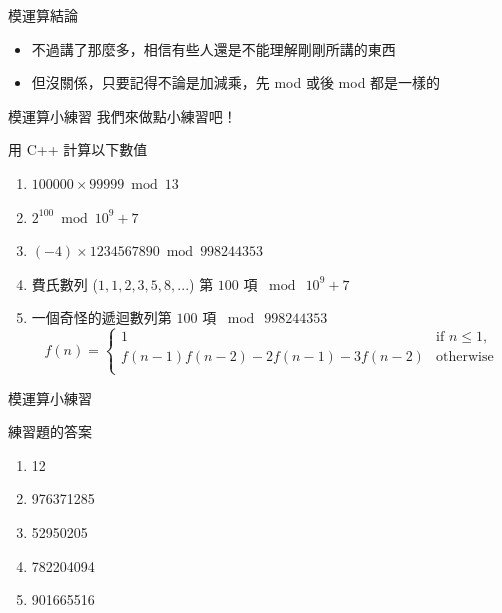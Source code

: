 \documentclass[aspectratio=169]{beamer}
\begin{document}
    \begin{frame}{模運算結論}
        \begin{itemize}
            \item 不過講了那麼多，相信有些人還是不能理解剛剛所講的東西
            \item 但沒關係，只要記得不論是加減乘，先 mod 或後 mod 都是一樣的
        \end{itemize}
    \end{frame}
    
    \begin{frame}{模運算小練習}
        我們來做點小練習吧！
        \begin{block}{用 C++ 計算以下數值}
            \begin{enumerate}
                \item $100000 \times 99999 \bmod 13$
                \item $2^{100} \bmod 10^9+7$
                \item $(-4) \times 1234567890 \bmod 998244353$
                \item 費氏數列 ($1,1,2,3,5,8,...$) 第 $100$ 項 $\bmod \ 10^9+7$
                \item 一個奇怪的遞迴數列第 $100$ 項 $\bmod \ 998244353$
                $$
                f(n) = \begin{cases}
                    1 & \text{if } n \le 1, \\
                    f(n-1)f(n-2) - 2f(n-1) - 3f(n-2) & \text{otherwise} \\
                \end{cases}
                $$
            \end{enumerate}
        \end{block}
    \end{frame}
    
    \begin{frame}{模運算小練習}
        \begin{block}{練習題的答案}
            \begin{enumerate}
                \item 12
                \item 976371285
                \item 52950205
                \item 782204094
                \item 901665516
            \end{enumerate}
        \end{block}
    \end{frame}
    
\end{document}
